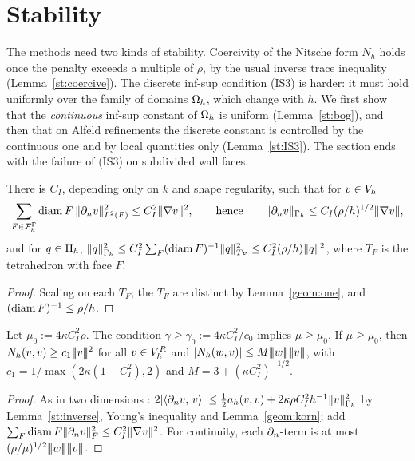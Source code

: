 \section{Stability}\label{sec:stability}

The methods need two kinds of stability. Coercivity of the Nitsche form $N_h$ holds once the penalty exceeds a multiple of $\rho$, by the usual inverse trace inequality (Lemma~\ref{st:coercive}). The discrete inf-sup condition (IS3) is harder: it must hold uniformly over the family of domains $\Omega_h$, which change with $h$. We first show that the \emph{continuous} inf-sup constant of $\Omega_h$ is uniform (Lemma~\ref{st:bog}), and then that on Alfeld refinements the discrete constant is controlled by the continuous one and by local quantities only (Lemma~\ref{st:IS3}). The section ends with the failure of (IS3) on subdivided wall faces.

\begin{lemma}\label{st:inverse}
There is $C_I$, depending only on $k$ and shape regularity, such that for $v\in V_h$
\[
\sum_{F\in\mathcal F_h^\Gamma}\operatorname{diam} F\,\lVert \partial_n v\rVert^2_{L^2(F)}\le C_I^2\lVert \nabla v\rVert^2,\qquad\text{hence}\qquad\lVert \partial_n v\rVert_{\Gamma_h}\le C_I(\rho/h)^{1/2}\lVert \nabla v\rVert,
\]
and for $q\in\Pi_h$, $\lVert q\rVert^2_{\Gamma_h}\le C_I^2\sum_{F}(\operatorname{diam} F)^{-1}\lVert q\rVert^2_{T_F}\le C_I^2(\rho/h)\lVert q\rVert^2$, where $T_F$ is the tetrahedron with face $F$.
\end{lemma}

\begin{proof}
Scaling on each $T_F$; the $T_F$ are distinct by Lemma~\ref{geom:one}, and $(\operatorname{diam} F)^{-1}\le\rho/h$.
\end{proof}

\begin{lemma}\label{st:coercive}
Let $\mu_0:=4\kappa C_I^2\rho$. The condition $\gamma\ge\gamma_0:=4\kappa C_I^2/c_0$ implies $\mu\ge\mu_0$. If $\mu\ge\mu_0$, then $N_h(v,v)\ge c_1|\!|\!|v|\!|\!|^2$ for all $v\in V_h^R$ and $|N_h(w,v)|\le M\tnorm w\tnorm v$, with $c_1=1/\max(2\kappa(1+C_I^2),2)$ and $M=3+(\kappa C_I^2)^{-1/2}$.
\end{lemma}

\begin{proof}
As in two dimensions \cite{PadhiLong2D}: $2|\langle \partial_n v,\, v\rangle|\le\frac12a_h(v,v)+2\kappa\rho C_I^2h^{-1}\lVert v\rVert^2_{\Gamma_h}$ by Lemma~\ref{st:inverse}, Young's inequality and Lemma~\ref{geom:korn}; add $\sum_F\operatorname{diam} F\lVert \partial_n v\rVert^2_F\le C_I^2\lVert \nabla v\rVert^2$. For continuity, each $\partial_n$-term is at most $(\rho/\mu)^{1/2}\tnorm w\tnorm v$.
\end{proof}

